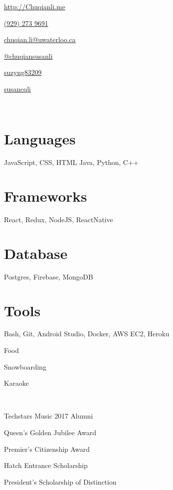 \documentclass[]{friggeri-cv}
\begin{document}
       {\href{http://chuqianli.me}{http://Chuqianli.me}}


\begin{aside}
  \begin{description}\raggedleft
	  \item \href{tel:19292739691}{(929) 273 9691 \faPhone}
	  \item \href{mailto:chuqian.li@uwaterloo.ca}{chuqian.li@uwaterloo.ca \faEnvelopeO}
	  \item \href{https://medium.com/@chuqiansusanli}{@chuqiansusanli \faMedium}
	  \item \href{https://github.com/suzyng83209}{suzyng83209 \faGithub}
	  \item \href{https://www.linkedin.com/in/susancqli}{susancqli \faLinkedin}
  \end{description}
  \
  \supersection{}
  \
  \supersection{}
  \
  \section{Languages}
  JavaScript, CSS, HTML
  Java, Python, C++
  \section{Frameworks}
  React, Redux, NodeJS, ReactNative
  \section{Database}
  Postgres, Firebase, MongoDB
  \section{Tools}
  Bash, Git, Android Studio, Docker, AWS EC2, Heroku
  \
  \supersection{}
  \
  \begin{description}\raggedleft
  	\item Food
  	\item Snowboarding
  	\item Karaoke
  \end{description}
	\
	\supersection{}
	\
	\begin{description}\raggedleft
	  	\item Techstars Music 2017 Alumni
		\item Queen's Golden Jubilee Award
		\item Premier's Citizenship Award
		\item Hatch Entrance Scholarship
		\item President's Scholarship of Distinction
	\end{description}
\end{aside}
\end{document}
